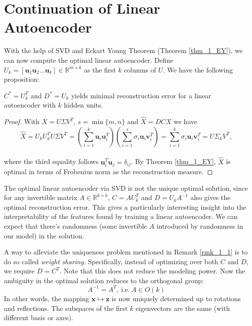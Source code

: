 \documentclass[../book-template.tex]{subfiles}
\begin{document}
\section{Continuation of Linear Autoencoder}
With the help of SVD and Eckart Young Theorem (Theorem \ref{thm_1_EY}), we can now compute the optimal linear autoencoder. Define $U_k=[\bm{u}_1\bm{u}_2\dots \bm{u}_k]\in \mathbb{R}^{m\times k}$ as the first $k$ columns of $U$. We have the following proposition:
\begin{proposition}
$C^*=U_k^T$ and $D^*=U_k$ yields minimal reconstruction error for a linear autoencoder with $k$ hidden units.
\end{proposition}
\begin{proof}
With $X=U\Sigma V^T$, $s=\min\{m,n\}$ and $\hat{X}=DCX$ we have
\begin{equation*}
    \hat{X} = U_k U_k^T U\Sigma V^T = \left(\sum_{i=1}^{k}\bm{u}_i\bm{u}^T_i\right)\left(\sum_{i=1}^{s}\sigma_i\bm{u}_i\bm{v}^T_i\right) = \sum_{i=1}^{k}\sigma_i\bm{u}_i\bm{v}^T_i = U\Sigma_kV^T,
\end{equation*}\\
where the third equality follows $\bm{u}_i^T\bm{u}_j=\delta_{ij}$. By Theorem \ref{thm_1_EY}, $\hat{X}$ is optimal in terms of Frobenius norm as the reconstruction measure.
\end{proof}
\begin{remark}\label{rmk_1_1}
The optimal linear autoencoder via SVD is not the unique optimal solution, since for any invertible matrix $A\in\mathbb{R}^{k\times k}$, $C=AU_k^T$ and $D=U_kA^{-1}$ also gives the optimal reconstruction error. This gives a particularly interesting insight into the interpretability of the features found by training a linear autoencoder. We can expect that there's randomness (some invertible $A$ introduced by randomness in our model) in the solution.
\end{remark}
A way to alleviate the uniqueness problem mentioned in Remark \ref{rmk_1_1} is to do so called \emph{weight sharing}. Specifically, instead of optimizing over both $C$ and $D$, we require $D=C^T$. Note that this does not reduce the modeling power. Now the ambiguity in the optimal solution reduces to the orthogonal group: 
\begin{equation*}
    A^{-1}=A^T,\ \text{i.e.}\ A\in O(k)
\end{equation*}
In other words, the mapping $\bm{x}\mapsto \bm{z}$ is now uniquely determined up to rotations and reflections. The subspaces of the first $k$ eigenvectors are the same (with different basis or axes).
\end{document}
